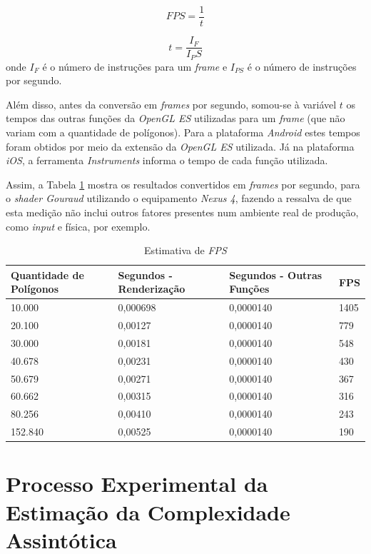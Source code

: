 	\begin{equation}
		FPS = \frac{1} {t}
	\label{fps}
	\end{equation}

	\begin{equation}
		t = \frac{I_F} {I_PS}
	\label{ips}
	\end{equation}
	 onde $I_{F}$ é o número de instruções para um \textit{frame} e $I_{PS}$ é o número de instruções por segundo.
	
	Além disso, antes da conversão em \textit{frames} por segundo, somou-se à variável $t$ os tempos das outras funções da \textit{OpenGL ES} utilizadas para um \textit{frame} (que não variam com a quantidade de polígonos). Para a plataforma \textit{Android} estes tempos foram obtidos por meio da extensão da \textit{OpenGL ES} utilizada. Já na plataforma \textit{iOS}, a ferramenta \textit{Instruments} informa o tempo de cada função utilizada.
	
	Assim, a Tabela \ref{t_fps} mostra os resultados convertidos em \textit{frames} por segundo, para o \textit{shader Gouraud} utilizando o equipamento \textit{Nexus 4}, fazendo a ressalva de que esta medição não inclui outros fatores presentes num ambiente real de produção, como \textit{input} e física, por exemplo.

	\begin{table}[ht]
	\centering	
	\begin{tabularx}{0.9\textwidth}{XXXX}
		\toprule
		\textbf{Quantidade de Polígonos} & \textbf{Segundos - Renderização} & \textbf{Segundos - Outras Funções} & \textbf{FPS}  \\
		\midrule
		10.000 &  0,000698 &  0,0000140 & 1405 \\
		20.100 &  0,00127 &  0,0000140 & 779 \\
		30.000 &  0,00181 &  0,0000140 & 548 \\
		40.678 &  0,00231 &  0,0000140 & 430 \\
		50.679 &  0,00271 &  0,0000140 & 367 \\
		60.662 &  0,00315  &  0,0000140 & 316 \\
		80.256 &  0,00410  &  0,0000140 & 243 \\
	          152.840 & 0,00525 &  0,0000140 & 190 \\
		\bottomrule
	\end{tabularx}
	\caption{Estimativa de \textit{FPS}}
	\label{t_fps}
	\end{table}


\section{Processo Experimental da Estimação da Complexidade Assintótica}  


